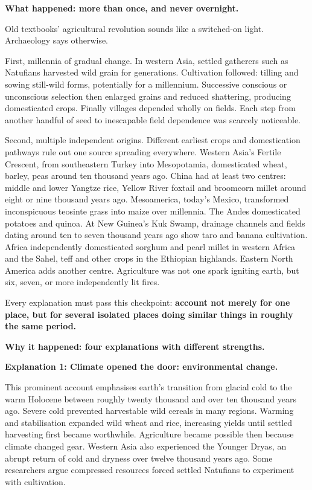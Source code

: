\textbf{What happened: more than once, and never overnight.}

Old textbooks' agricultural revolution sounds like a switched-on light. Archaeology says otherwise.

First, millennia of gradual change. In western Asia, settled gatherers such as Natufians harvested wild grain for generations. Cultivation followed: tilling and sowing still-wild forms, potentially for a millennium. Successive conscious or unconscious selection then enlarged grains and reduced shattering, producing domesticated crops. Finally villages depended wholly on fields. Each step from another handful of seed to inescapable field dependence was scarcely noticeable.

Second, multiple independent origins. Different earliest crops and domestication pathways rule out one source spreading everywhere. Western Asia's Fertile Crescent, from southeastern Turkey into Mesopotamia, domesticated wheat, barley, peas around ten thousand years ago. China had at least two centres: middle and lower Yangtze rice, Yellow River foxtail and broomcorn millet around eight or nine thousand years ago. Mesoamerica, today's Mexico, transformed inconspicuous teosinte grass into maize over millennia. The Andes domesticated potatoes and quinoa. At New Guinea's Kuk Swamp, drainage channels and fields dating around ten to seven thousand years ago show taro and banana cultivation. Africa independently domesticated sorghum and pearl millet in western Africa and the Sahel, teff and other crops in the Ethiopian highlands. Eastern North America adds another centre. Agriculture was not one spark igniting earth, but six, seven, or more independently lit fires.

Every explanation must pass this checkpoint: \textbf{account not merely for one place, but for several isolated places doing similar things in roughly the same period.}

\textbf{Why it happened: four explanations with different strengths.}

\textbf{Explanation 1: Climate opened the door: environmental change.}

This prominent account emphasises earth's transition from glacial cold to the warm Holocene between roughly twenty thousand and over ten thousand years ago. Severe cold prevented harvestable wild cereals in many regions. Warming and stabilisation expanded wild wheat and rice, increasing yields until settled harvesting first became worthwhile. Agriculture became possible then because climate changed gear. Western Asia also experienced the Younger Dryas, an abrupt return of cold and dryness over twelve thousand years ago. Some researchers argue compressed resources forced settled Natufians to experiment with cultivation.

